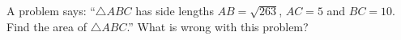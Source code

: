 A problem says: ``$\triangle ABC$ has side lengths $AB=\sqrt{263}$, $AC=5$ and $BC=10$. Find the area of $\triangle ABC$.'' What is wrong with this problem?
